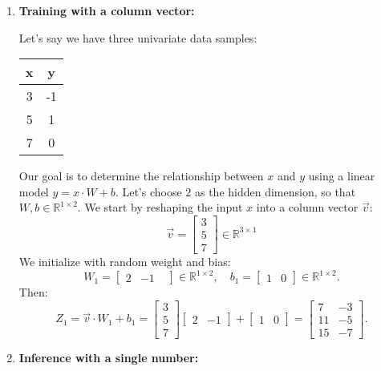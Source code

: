 \begin{enumerate}
    \item \textbf{Training with a column vector:}
    
    Let's say we have three univariate data samples:
    \begin{center}
    \begin{tabular}{ |c||c|  }
        x & y \\
        \hline
        3 & -1 \\
        5 & 1 \\
        7 & 0
    \end{tabular}
    \end{center}

    Our goal is to determine the relationship between $x$ and $y$ using a linear model $y = x\cdot W +b$. Let's choose $2$ as the hidden dimension, so that $W,b\in\mathbb{R}^{1\times 2}$. We start by reshaping the input $x$ into a column vector $\vec{v}$:
    $$\vec{v} = \begin{bmatrix}
    3 \\ 5 \\ 7 
    \end{bmatrix}\in \mathbb{R}^{3\times 1}$$
    We initialize with random weight and bias:
    $$W_1 = \begin{bmatrix} 2 & -1 & \end{bmatrix} \in \mathbb{R}^{1\times 2}, \quad b_1 = \begin{bmatrix} 1 & 0 \end{bmatrix} \in \mathbb{R}^{1\times 2}.$$
    Then: 
    $$Z_1 = \vec{v}\cdot W_1 + b_1 = \begin{bmatrix} 3 \\ 5 \\ 7 \end{bmatrix} \begin{bmatrix} 2 & -1 \end{bmatrix} + \begin{bmatrix} 1 & 0 \end{bmatrix} = \begin{bmatrix} 7 & -3 \\ 11 & -5 \\ 15 & -7 \end{bmatrix}.$$

    \item \textbf{Inference with a single number:}
    

\end{enumerate}
